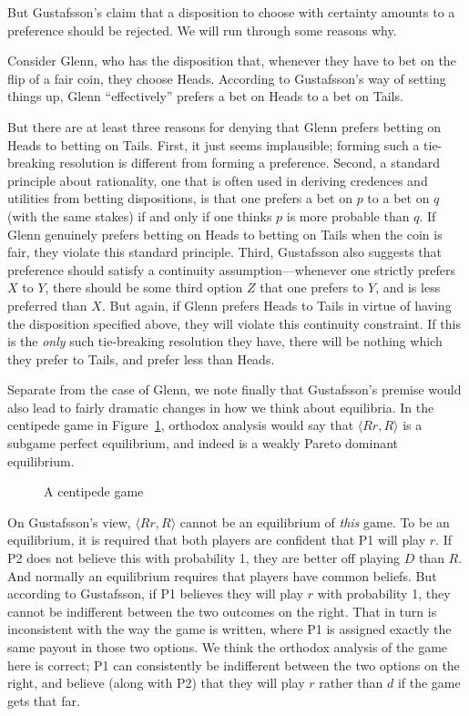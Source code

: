 \documentclass[
  11pt,
  letterpaper]{article}
\begin{document}
But Gustafsson's claim that a disposition to choose with certainty amounts to a preference should be rejected. We will run through some reasons why. 

Consider Glenn, who has the disposition that, whenever they have to bet on the flip of a fair coin, they choose Heads. According to Gustafsson's way of setting things up, Glenn ``effectively'' prefers a bet on Heads to a bet on Tails.

But there are at least three reasons for denying that Glenn prefers betting on Heads to betting on Tails. First, it just seems implausible; forming such a tie-breaking resolution is different from forming a preference. Second, a standard principle about rationality, one that is often used in deriving credences and utilities from betting dispositions, is that one prefers a bet on $p$ to a bet on $q$ (with the same stakes) if and only if one thinks $p$ is more probable than $q$. If Glenn genuinely prefers betting on Heads to betting on Tails when the coin is fair, they violate this standard principle. Third, Gustafsson also suggests that preference should satisfy a continuity assumption---whenever one strictly prefers $X$ to $Y$, there should be some third option $Z$ that one prefers to $Y$, and is less preferred than $X$. But again, if Glenn prefers Heads to Tails in virtue of having the disposition specified above, they will violate this continuity constraint. If this is the \emph{only} such tie-breaking resolution they have, there will be nothing which they prefer to Tails, and prefer less than Heads. 

Separate from the case of Glenn, we note finally that Gustafsson's premise would also lead to fairly dramatic changes in how we think about equilibria. In the centipede game in Figure~\ref{fig-centipede}, orthodox analysis would say that $\langle Rr, R \rangle$ is a subgame perfect equilibrium, and indeed is a weakly Pareto dominant equilibrium.

\begin{figure}

\centering{



}

\caption{\label{fig-centipede}A centipede game}

\end{figure}%

On Gustafsson's view, $\langle Rr, R \rangle$ cannot be an equilibrium of \emph{this} game. To be an equilibrium, it is required that both players are confident that P1 will play $r$. If P2 does not believe this with probability 1, they are better off playing $D$ than $R$. And normally an equilibrium requires that players have common beliefs. But according to Gustafsson, if P1 believes they will play $r$ with probability 1, they cannot be indifferent between the two outcomes on the right. That in turn is inconsistent with the way the game is written, where P1 is assigned exactly the same payout in those two options. We think the orthodox analysis of the game here is correct; P1 can consistently be indifferent between the two options on the right, and believe (along with P2) that they will play $r$ rather than $d$ if the game gets that far.
\end{document}
